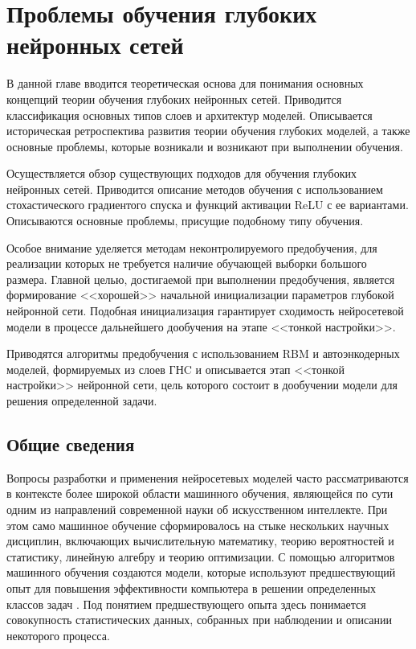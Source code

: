 \chapter{Проблемы обучения глубоких нейронных сетей}

В данной главе вводится теоретическая основа для понимания основных концепций теории обучения глубоких нейронных сетей. Приводится классификация основных типов слоев и архитектур моделей. Описывается историческая ретроспектива развития теории обучения глубоких моделей, а также основные проблемы, которые возникали и возникают при выполнении обучения. 

Осуществляется обзор существующих подходов для обучения глубоких нейронных сетей. Приводится описание методов обучения с использованием стохастического градиентого спуска и функций активации ReLU с ее вариантами. Описываются основные проблемы, присущие подобному типу обучения.

Особое внимание уделяется методам неконтролируемого предобучения, для реализации которых не требуется наличие обучающей выборки большого размера. Главной целью, достигаемой при выполнении предобучения, является формирование <<хорошей>> начальной инициализации параметров глубокой нейронной сети. Подобная инициализация гарантирует сходимость нейросетевой модели в процессе дальнейшего дообучения на этапе <<тонкой настройки>>.


Приводятся алгоритмы предобучения с использованием RBM и автоэнкодерных моделей, формируемых из слоев ГНC и описывается этап <<тонкой настройки>> нейронной сети, цель которого состоит в дообучении модели для решения определенной задачи.

\section{Общие сведения}

Вопросы разработки и применения нейросетевых моделей часто рассматриваются в контексте более широкой области машинного обучения, являющейся по сути одним из направлений современной науки об искусственном интеллекте. При этом само машинное обучение сформировалось на стыке нескольких научных дисциплин, включающих вычислительную математику, теорию вероятностей и статистику, линейную алгебру и теорию оптимизации. С помощью алгоритмов машинного обучения создаются модели, которые используют предшествующий опыт для повышения эффективности компьютера в решении определенных классов задач \cite{mitchell1997machine}. Под понятием предшествующего опыта здесь понимается совокупность статистических данных, собранных при наблюдении и описании некоторого процесса. 

